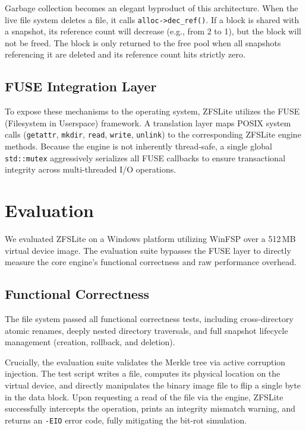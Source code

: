 \documentclass[pdflatex,sn-mathphys-num]{sn-jnl}
\begin{document}
Garbage collection becomes an elegant byproduct of this architecture. When the live file system deletes a file, it calls \verb+alloc->dec_ref()+. If a block is shared with a snapshot, its reference count will decrease (e.g., from 2 to 1), but the block will not be freed. The block is only returned to the free pool when all snapshots referencing it are deleted and its reference count hits strictly zero.

\subsection{FUSE Integration Layer}
To expose these mechanisms to the operating system, ZFSLite utilizes the FUSE (Filesystem in Userspace) framework. A translation layer maps POSIX system calls (\verb+getattr+, \verb+mkdir+, \verb+read+, \verb+write+, \verb+unlink+) to the corresponding ZFSLite engine methods. Because the engine is not inherently thread-safe, a single global \verb+std::mutex+ aggressively serializes all FUSE callbacks to ensure transactional integrity across multi-threaded I/O operations.



\section{Evaluation}\label{sec:eval}

We evaluated ZFSLite on a Windows platform utilizing WinFSP over a 512\,MB virtual device image. The evaluation suite bypasses the FUSE layer to directly measure the core engine's functional correctness and raw performance overhead.

\subsection{Functional Correctness}

The file system passed all functional correctness tests, including cross-directory atomic renames, deeply nested directory traversals, and full snapshot lifecycle management (creation, rollback, and deletion).

Crucially, the evaluation suite validates the Merkle tree via active corruption injection. The test script writes a file, computes its physical location on the virtual device, and directly manipulates the binary image file to flip a single byte in the data block. Upon requesting a read of the file via the engine, ZFSLite successfully intercepts the operation, prints an integrity mismatch warning, and returns an \verb+-EIO+ error code, fully mitigating the bit-rot simulation.
\end{document}
